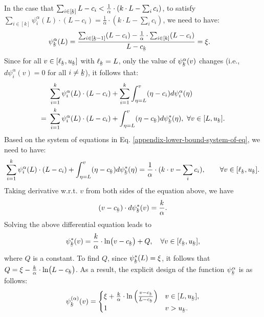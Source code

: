 In the case that $\sum_{i\in[\ubar{k}]} L - c_{i} < \frac{1}{\alpha} \cdot (k\cdot L - \sum_{i} c_{i})$, to satisfy $\sum_{i \in [k]} \psi^{\alpha}_{i}(L) \cdot (L-c_{i}) = \frac{1}{\alpha} \cdot (k\cdot L - \sum_{i} c_{i}) $, we need to have:
\begin{align*}
        &\psi^{\alpha}_{\ubar{k}}(L) = \frac{\sum_{i \in [\ubar{k}-1]} (L-c_i) - \frac{1}{\alpha}\cdot \sum_{i \in [k]}(L-c_{i})}{L-c_{\ubar{k}}} =  \xi.
\end{align*}
Since for all $v \in [\ell_{\ubar{k}},u_{\ubar{k}}]$ with $ \ell_{\ubar{k}} = L $, only the value of  $\psi^{\alpha}_{\ubar{k}}(v)$ changes (i.e., $d\psi^{\alpha}_{i}(v) = 0$ for all $i \not = \ubar{k} $), it follows that:
\begin{align*}
       &\sum_{i=1}^{k} \psi^{\alpha}_{i}(L) \cdot (L - c_{i}) + \sum_{i=1}^{k} \int_{\eta =L}^{v} (\eta - c_{i} )d\psi^{\alpha}_{i}(\eta) \\
    =\ & \sum_{i=1}^{k}  \psi^{\alpha}_{i}(L) \cdot (L - c_{i}) + \int_{\eta =L}^{v} (\eta - c_{\ubar{k}} )d\psi^{*}_{\ubar{k}}(\eta), \ \forall v \in [L,u_{\ubar{k}}].
\end{align*}
Based on the system of  equations in Eq. \eqref{appendix-lower-bound-system-of-eq}, we need to have:
\begin{align*}
  \sum_{i=1}^{k}  \psi^{\alpha}_{i}(L) \cdot (L - c_{i}) + \int_{\eta =L}^{v} (\eta - c_{\ubar{k}} )d\psi^{*}_{\ubar{k}}(\eta)
 = \frac{1}{\alpha} \cdot (k\cdot v - \sum_{i} c_{i}), \qquad \forall v \in [\ell_{\ubar{k}},u_{\ubar{k}}].
\end{align*}
Taking derivative w.r.t. $ v $ from both sides of the equation above, we have
\begin{align*}
    (v - c_{\ubar{k}}) \cdot d\psi^{*}_{\ubar{k}}(v) = \frac{k}{\alpha}.
\end{align*}
Solving the above differential equation leads to 
\begin{align*}
\psi^{*}_{\ubar{k}}(v) = \frac{k}{\alpha} \cdot \ln(v-c_{\ubar{k}}) + Q,  \quad \forall v \in [\ell_{\ubar{k}},u_{\ubar{k}}],
\end{align*}
where $ Q $ is a constant. To find $ Q $, since $\psi^{*}_{\ubar{k}}(L) =\xi$, it follows that $ Q = \xi - \frac{k}{\alpha} \cdot \ln(L-c_{\ubar{k}})$. As a result, the explicit design of the function $\psi^{\alpha}_{\ubar{k}}$ is as follows:
\begin{align*}
    \psi^{(\alpha)}_{\ubar{k}}(v) =
    \begin{cases}
         \xi + \frac{k}{\alpha} \cdot \ln\left(\frac{v - c_{\ubar{k}}}{L - c_{\ubar{k}}}\right) &  v \in [L,u_{\ubar{k}}], \\
         1 & v > u_{\ubar{k}}.
         \end{cases}
\end{align*}
